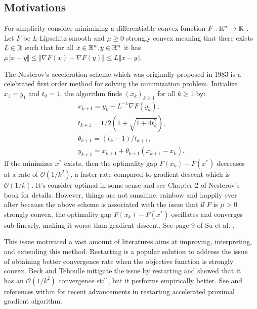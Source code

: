 \documentclass[12pt]{article}
\begin{document}
    \subsection{Motivations}
        For simplicity consider minimizing a differentiable convex function $F: \mathbb R^n \rightarrow \mathbb R$ . 
        Let $F$ be $L$-Lipschitz smooth and $\mu \ge 0$ strongly convex meaning that there exists $L \in \mathbb R$ such that for all $x \in \mathbb R^n, y\in \mathbb R^n$ it has $\mu\Vert x - y\Vert\le \Vert \nabla F(x) - \nabla F(y)\Vert \le L \Vert x - y \Vert$. 
        \par 
        The Nesterov's acceleration scheme which was originally proposed in 1983 \cite{nesterov_method_1983} is a celebrated first order method for solving the minimization problem. 
        Initialize $x_1 = y_1$ and $t_0 = 1$, the algorithm finds $(x_k)_{k \ge 1}$ for all $k \ge 1$ by: 
        \begin{align}
            & x_{k + 1} = y_k - L^{-1}\nabla F(y_k), 
            \\
            & t_{k + 1} = 1/2\left(1 + \sqrt{1 + 4t_{k}^2}\right), 
            \\
            & \theta_{k + 1} = (t_{k} - 1)/t_{k + 1}, 
            \\
            & y_{k + 1} = x_{k + 1} + \theta_{k + 1}(x_{k + 1} - x_k). 
        \end{align}\label{eqn:example_algorithm}
        If the minimizer $x^*$ exists, then the optimality gap $F(x_k) - F(x^*)$ decreases at a rate of $\mathcal O(1/k^2)$, a faster rate compared to gradient descent which is $\mathcal O(1/k)$. 
        It's consider optimal in some sense and see Chapter 2 of Nesterov's book \cite{nesterov_lectures_2018} for details. 
        However, things are not sunshine, rainbow and happily ever after because the above scheme is associated with the issue that if $F$ is $\mu > 0$ strongly convex, the optimality gap $F(x_k) - F(x^*)$ oscillates and converges sub-linearly, making it worse than gradient descent. See page 9 of Su et al. \cite{su_differential_2016}. 
        \par
        This issue motivated a vast amount of literatures aims at improving, interpreting, and extending this method. 
        Restarting is a popular solution to address the issue of obtaining better convergence rate when the objective function is strongly convex. 
        Beck and Teboulle \cite{beck_fast_2009} mitigate the issue by restarting and showed that it has an $\mathcal O(1/k^2)$ convergence still, but it performs empirically better. 
        See \cite{necoara_linear_2019}\cite{aujol_parameter-free_2024} and references within for recent advancements in restarting accelerated proximal gradient algorithm. 
        
\end{document}
